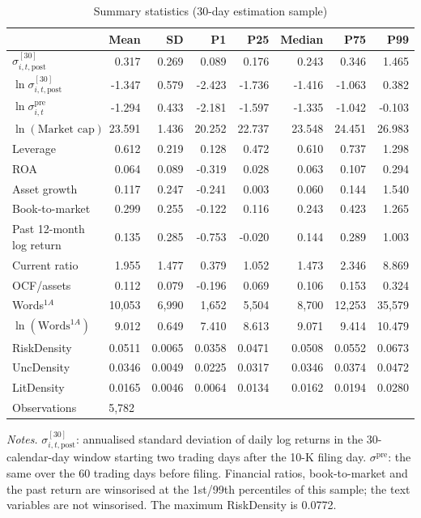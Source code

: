 \begin{table}[htbp]
\centering
\caption{Summary statistics (30-day estimation sample)}
\label{tab:summary}
\small
\begin{tabular}{lrrrrrrr}
\toprule
 & Mean & SD & P1 & P25 & Median & P75 & P99 \\
\midrule
$\sigma^{[30]}_{i,t,\mathrm{post}}$ & 0.317 & 0.269 & 0.089 & 0.176 & 0.243 & 0.346 & 1.465 \\
$\ln\sigma^{[30]}_{i,t,\mathrm{post}}$ & -1.347 & 0.579 & -2.423 & -1.736 & -1.416 & -1.063 & 0.382 \\
$\ln\sigma^{\mathrm{pre}}_{i,t}$ & -1.294 & 0.433 & -2.181 & -1.597 & -1.335 & -1.042 & -0.103 \\
$\ln(\text{Market cap})$ & 23.591 & 1.436 & 20.252 & 22.737 & 23.548 & 24.451 & 26.983 \\
Leverage & 0.612 & 0.219 & 0.128 & 0.472 & 0.610 & 0.737 & 1.298 \\
ROA & 0.064 & 0.089 & -0.319 & 0.028 & 0.063 & 0.107 & 0.294 \\
Asset growth & 0.117 & 0.247 & -0.241 & 0.003 & 0.060 & 0.144 & 1.540 \\
Book-to-market & 0.299 & 0.255 & -0.122 & 0.116 & 0.243 & 0.423 & 1.265 \\
Past 12-month log return & 0.135 & 0.285 & -0.753 & -0.020 & 0.144 & 0.289 & 1.003 \\
Current ratio & 1.955 & 1.477 & 0.379 & 1.052 & 1.473 & 2.346 & 8.869 \\
OCF/assets & 0.112 & 0.079 & -0.196 & 0.069 & 0.106 & 0.153 & 0.324 \\
Words$^{1A}$ & 10,053 & 6,990 & 1,652 & 5,504 & 8,700 & 12,253 & 35,579 \\
$\ln(\text{Words}^{1A})$ & 9.012 & 0.649 & 7.410 & 8.613 & 9.071 & 9.414 & 10.479 \\
RiskDensity & 0.0511 & 0.0065 & 0.0358 & 0.0471 & 0.0508 & 0.0552 & 0.0673 \\
UncDensity & 0.0346 & 0.0049 & 0.0225 & 0.0317 & 0.0346 & 0.0374 & 0.0472 \\
LitDensity & 0.0165 & 0.0046 & 0.0064 & 0.0134 & 0.0162 & 0.0194 & 0.0280 \\
\midrule
Observations & \multicolumn{7}{l}{5,782} \\
\bottomrule
\end{tabular}
\par\smallskip
\begin{minipage}{\linewidth}\footnotesize
\emph{Notes.} $\sigma^{[30]}_{i,t,\mathrm{post}}$: annualised standard deviation of daily log returns in the 30-calendar-day window starting two trading days after the 10-K filing day. $\sigma^{\mathrm{pre}}$: the same over the 60 trading days before filing. Financial ratios, book-to-market and the past return are winsorised at the 1st/99th percentiles of this sample; the text variables are not winsorised. The maximum RiskDensity is 0.0772.
\end{minipage}
\end{table}
